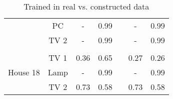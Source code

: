 \begin{table}[H]
\begin{tabular}{ccccccc}
\multicolumn{1}{|c|}{}                          & \multicolumn{1}{c|}{PC}     & \multicolumn{1}{c|}{-}    & \multicolumn{1}{c|}{0.99}     & \multicolumn{1}{c|}{} & \multicolumn{1}{c|}{-}    & \multicolumn{1}{c|}{0.99}     \\ \cline{2-4} \cline{6-7} 
\multicolumn{1}{|c|}{}                          & \multicolumn{1}{c|}{TV 2}   & \multicolumn{1}{c|}{-}    & \multicolumn{1}{c|}{0.99}     & \multicolumn{1}{c|}{} & \multicolumn{1}{c|}{-}    & \multicolumn{1}{c|}{0.99}     \\ \cline{1-4} \cline{6-7} 
\multicolumn{1}{l}{}                            &                             &                           &                               &                       &                           &                               \\ \cline{1-4} \cline{6-7} 
\multicolumn{1}{|c|}{\multirow{3}{*}{House 18}} & \multicolumn{1}{c|}{TV 1}   & \multicolumn{1}{c|}{0.36} & \multicolumn{1}{c|}{0.65}     & \multicolumn{1}{c|}{} & \multicolumn{1}{c|}{0.27} & \multicolumn{1}{c|}{0.26}     \\ \cline{2-4} \cline{6-7} 
\multicolumn{1}{|c|}{}                          & \multicolumn{1}{c|}{Lamp}   & \multicolumn{1}{c|}{-}    & \multicolumn{1}{c|}{0.99}     & \multicolumn{1}{c|}{} & \multicolumn{1}{c|}{-}    & \multicolumn{1}{c|}{0.99}     \\ \cline{2-4} \cline{6-7} 
\multicolumn{1}{|c|}{}                          & \multicolumn{1}{c|}{TV 2}   & \multicolumn{1}{c|}{0.73} & \multicolumn{1}{c|}{0.58}     & \multicolumn{1}{c|}{} & \multicolumn{1}{c|}{0.73} & \multicolumn{1}{c|}{0.58}     \\ \cline{1-4} \cline{6-7} 
\end{tabular}                         
\caption{Trained in real vs. constructed data}                     
\label{table:Tab:RealVsCon}                    
\end{table}  
